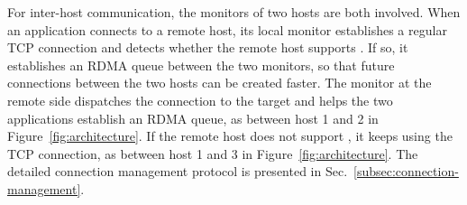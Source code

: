 For inter-host communication, the monitors of two hosts are both involved. When an application connects to a remote host, its local monitor establishes a regular TCP connection and detects whether the remote host supports \sys{}.
If so, it establishes an RDMA queue between the two monitors, so that future connections between the two hosts can be created faster. The monitor at the remote side dispatches the connection to the target and helps the two applications establish an RDMA queue, as between host 1 and 2 in Figure~\ref{fig:architecture}. If the remote host does not support \sys{}, it keeps using the TCP connection, as between host 1 and 3 in Figure~\ref{fig:architecture}. The detailed connection management protocol is presented in Sec.~\ref{subsec:connection-management}.





